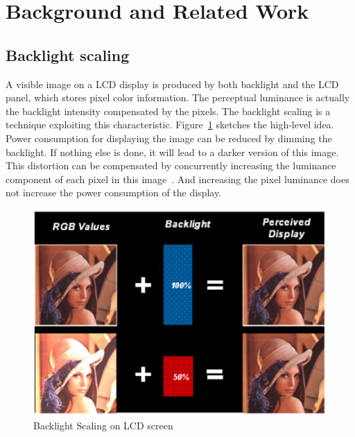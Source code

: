 \section{Background and Related Work}
\label{sec:background}
\subsection{Backlight scaling}
A visible image on a LCD display is produced by both backlight and the
LCD panel, which stores pixel color information. The perceptual
luminance is actually the backlight intensity compensated by the
pixels. The backlight scaling is a technique exploiting this
characteristic.  Figure~\ref{fig:backlightscaling} sketches the
high-level idea. Power consumption for displaying the
image can be reduced by dimming the backlight. If nothing else is
done, it will lead to a darker version of this image. This distortion
can be compensated by concurrently increasing the luminance component
of each pixel in this image~\cite{PMLDV03, CHP07, CCS06, CSC02}. And
increasing the pixel luminance does not increase the power
consumption of the display.

\begin{figure}[t]
  \centering
  \includegraphics[width=.5\textwidth]{./figures/backlightscaling.eps}
  \caption{Backlight Scaling on LCD screen}
  \label{fig:backlightscaling}
\end{figure}

